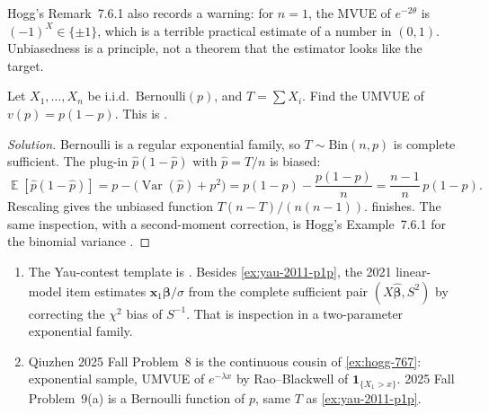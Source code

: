 \documentclass[11pt,a4paper]{article}
\DeclareMathOperator{\Var}{Var}
\DeclareMathOperator{\E}{\mathbb{E}}
\begin{document}
Hogg's Remark~7.6.1 also records a warning: for \(n=1\), the MVUE of \(e^{-2\theta}\) is \((-1)^X\in\{\pm1\}\), which is a terrible practical estimate of a number in \((0,1)\). Unbiasedness is a principle, not a theorem that the estimator looks like the target.

\begin{exercise}
\label{ex:yau-2011-p1p}
Let \(X_1,\dots,X_n\) be i.i.d.\ \(\mathrm{Bernoulli}(p)\), and \(T=\sum X_i\). Find the UMVUE of \(v(p)=p(1-p)\). This is \citep[Problem~5(b)]{yau2011}.
\end{exercise}

\begin{proof}[Solution]
Bernoulli is a regular exponential family, so \(T\sim\mathrm{Bin}(n,p)\) is complete sufficient. The plug-in \(\hat p(1-\hat p)\) with \(\hat p=T/n\) is biased:
\[
\E[\hat p(1-\hat p)]
=
p-\bigl(\Var(\hat p)+p^2\bigr)
=
p(1-p)-\frac{p(1-p)}{n}
=
\frac{n-1}{n}\,p(1-p).
\]
Rescaling gives the unbiased function \(T(n-T)/(n(n-1))\).  finishes. The same inspection, with a second-moment correction, is Hogg's Example~7.6.1 for the binomial variance \citep[\S7.6]{hogg2019}.
\end{proof}

\begin{remark}
\label{rem:p10-sources}
\begin{enumerate}[label=\textup{(\arabic*)}]
    \item
    The Yau-contest template is \citep{yau2011,yau2021}. Besides \cref{ex:yau-2011-p1p}, the 2021 linear-model item estimates \(\mathbf{x}_1\boldsymbol{\beta}/\sigma\) from the complete sufficient pair \((X\hat{\boldsymbol{\beta}},S^2)\) by correcting the \(\chi^2\) bias of \(S^{-1}\). That is inspection in a two-parameter exponential family.
    \item
    Qiuzhen 2025 Fall Problem~8 is the continuous cousin of \cref{ex:hogg-767}: exponential sample, UMVUE of \(e^{-\lambda x}\) by Rao--Blackwell of \(\mathbf{1}_{\{X_1>x\}}\). 2025 Fall Problem~9(a) is a Bernoulli function of \(p\), same \(T\) as \cref{ex:yau-2011-p1p}.
\end{enumerate}
\end{remark}
\end{document}
